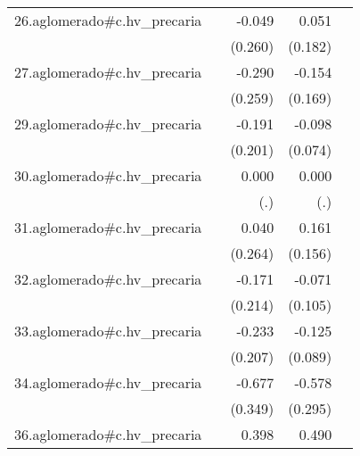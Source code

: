 {\begin{longtable}{l*{4}{D{.}{.}{-1}}}
\addlinespace
26.aglomerado#c.hv\_precaria&                     &      -0.049         &       0.051         &                     \\
            &                     &     (0.260)         &     (0.182)         &                     \\
\addlinespace
27.aglomerado#c.hv\_precaria&                     &      -0.290         &      -0.154         &                     \\
            &                     &     (0.259)         &     (0.169)         &                     \\
\addlinespace
29.aglomerado#c.hv\_precaria&                     &      -0.191         &      -0.098         &                     \\
            &                     &     (0.201)         &     (0.074)         &                     \\
\addlinespace
30.aglomerado#c.hv\_precaria&                     &       0.000         &       0.000         &                     \\
            &                     &         (.)         &         (.)         &                     \\
\addlinespace
31.aglomerado#c.hv\_precaria&                     &       0.040         &       0.161         &                     \\
            &                     &     (0.264)         &     (0.156)         &                     \\
\addlinespace
32.aglomerado#c.hv\_precaria&                     &      -0.171         &      -0.071         &                     \\
            &                     &     (0.214)         &     (0.105)         &                     \\
\addlinespace
33.aglomerado#c.hv\_precaria&                     &      -0.233         &      -0.125         &                     \\
            &                     &     (0.207)         &     (0.089)         &                     \\
\addlinespace
34.aglomerado#c.hv\_precaria&                     &      -0.677         &      -0.578\sym{*}  &                     \\
            &                     &     (0.349)         &     (0.295)         &                     \\
\addlinespace
36.aglomerado#c.hv\_precaria&                     &       0.398         &       0.490\sym{**} &                     \\

\end{longtable}}
